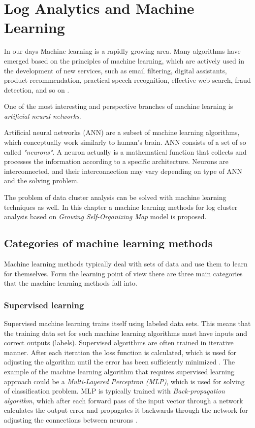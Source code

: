 \documentclass[thesis=M,english]{FITthesis}[2019/12/23]
\begin{document}
\chapter{Log Analytics and Machine Learning}
In our days Machine learning is a rapidly growing area. Many algorithms have emerged based on the principles of machine learning, which are actively used in the development of new services, such as email filtering, digital assistants, product recommendation, practical speech recognition, effective web search, fraud detection, and so on \cite{ml-use-cases}.

One of the most interesting and perspective branches of machine learning is \textit{artificial neural networks}.

Artificial neural networks (ANN) are a subset of machine learning algorithms, which conceptually work similarly to human's brain. ANN consists of a set of so called \textit{"neurons"}. A neuron actually is a mathematical function that collects and processes the information according to a specific architecture. Neurons are interconnected, and their interconnection may vary depending on type of ANN and the solving problem\cite{nn-basics}.

The problem of data cluster analysis can be solved with machine learning techniques as well. In this chapter a machine learning methods for log cluster analysis based on \textit{Growing Self-Organizing Map} model is proposed.

\section{Categories of machine learning methods}
Machine learning methods typically deal with sets of data and use them to learn for themselves. Form the learning point of view there are three main categories that the machine learning methods fall into.

\subsection{Supervised learning}
Supervised machine learning trains itself using labeled data sets. This means that the training data set for such machine learning algorithms must have inputs and correct outputs (labels). Supervised algorithms are often trained in iterative manner. After each iteration the loss function is calculated, which is used for adjusting the algorithm until the error has been sufficiently minimized \cite{ibm-supervised-learning}. The example of the machine learning algorithm that requires supervised learning approach could be a \textit{Multi-Layered Perceptron (MLP)}, which is used for solving of classification problem. MLP is typically trained with \textit{Back-propagation algorithm}, which after each forward pass of the input vector through a network calculates the output error and propagates it backwards through the network for adjusting the connections between neurons \cite{backprop-description}.
\end{document}
